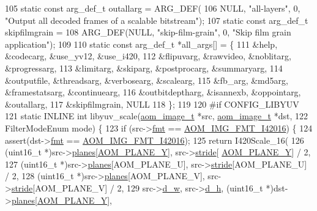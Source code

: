 \begin{DoxyCodeInclude}
105 \textcolor{keyword}{static} \textcolor{keyword}{const} arg\_def\_t outallarg = ARG\_DEF(
106     NULL, \textcolor{stringliteral}{"all-layers"}, 0, \textcolor{stringliteral}{"Output all decoded frames of a scalable bitstream"});
107 \textcolor{keyword}{static} \textcolor{keyword}{const} arg\_def\_t skipfilmgrain =
108     ARG\_DEF(NULL, \textcolor{stringliteral}{"skip-film-grain"}, 0, \textcolor{stringliteral}{"Skip film grain application"});
109 
110 \textcolor{keyword}{static} \textcolor{keyword}{const} arg\_def\_t *all\_args[] = \{
111   &help,           &codecarg,   &use\_yv12,      &use\_i420,
112   &flipuvarg,      &rawvideo,   &noblitarg,     &progressarg,
113   &limitarg,       &skiparg,    &postprocarg,   &summaryarg,
114   &outputfile,     &threadsarg, &verbosearg,    &scalearg,
115   &fb\_arg,         &md5arg,     &framestatsarg, &continuearg,
116   &outbitdeptharg, &isannexb,   &oppointarg,    &outallarg,
117   &skipfilmgrain,  NULL
118 \};
119 
120 \textcolor{preprocessor}{#if CONFIG\_LIBYUV}
121 \textcolor{keyword}{static} INLINE \textcolor{keywordtype}{int} libyuv\_scale(\hyperlink{structaom__image}{aom\_image\_t} *src, \hyperlink{structaom__image}{aom\_image\_t} *dst,
122                                FilterModeEnum mode) \{
123   \textcolor{keywordflow}{if} (src->\hyperlink{structaom__image_a6c64b1ab918d80d52eb8f5d6d957e825}{fmt} == \hyperlink{aom__image_8h_a930317c04b4bd0a660bb5e744055523ca20a9cf30277260685642b4cfb4e9273b}{AOM\_IMG\_FMT\_I42016}) \{
124     assert(dst->\hyperlink{structaom__image_a6c64b1ab918d80d52eb8f5d6d957e825}{fmt} == \hyperlink{aom__image_8h_a930317c04b4bd0a660bb5e744055523ca20a9cf30277260685642b4cfb4e9273b}{AOM\_IMG\_FMT\_I42016});
125     \textcolor{keywordflow}{return} I420Scale\_16(
126         (uint16\_t *)src->\hyperlink{structaom__image_ac54dbc5237ca2914f9ec30105dfbe302}{planes}[\hyperlink{aom__image_8h_a2ad22076006b15cf809edcaa33f6d339}{AOM\_PLANE\_Y}], src->\hyperlink{structaom__image_a6dc693d7dbc9eb06c0cdde307ca58372}{stride}[
      \hyperlink{aom__image_8h_a2ad22076006b15cf809edcaa33f6d339}{AOM\_PLANE\_Y}] / 2,
127         (uint16\_t *)src->\hyperlink{structaom__image_ac54dbc5237ca2914f9ec30105dfbe302}{planes}[AOM\_PLANE\_U], src->\hyperlink{structaom__image_a6dc693d7dbc9eb06c0cdde307ca58372}{stride}[AOM\_PLANE\_U] / 2,
128         (uint16\_t *)src->\hyperlink{structaom__image_ac54dbc5237ca2914f9ec30105dfbe302}{planes}[AOM\_PLANE\_V], src->\hyperlink{structaom__image_a6dc693d7dbc9eb06c0cdde307ca58372}{stride}[AOM\_PLANE\_V] / 2,
129         src->\hyperlink{structaom__image_a89f80b1f58d608b9d2080635f4359034}{d\_w}, src->\hyperlink{structaom__image_ab986419a1f0fff93a2dc505f47194988}{d\_h}, (uint16\_t *)dst->\hyperlink{structaom__image_ac54dbc5237ca2914f9ec30105dfbe302}{planes}[\hyperlink{aom__image_8h_a2ad22076006b15cf809edcaa33f6d339}{AOM\_PLANE\_Y}],

\end{DoxyCodeInclude}
